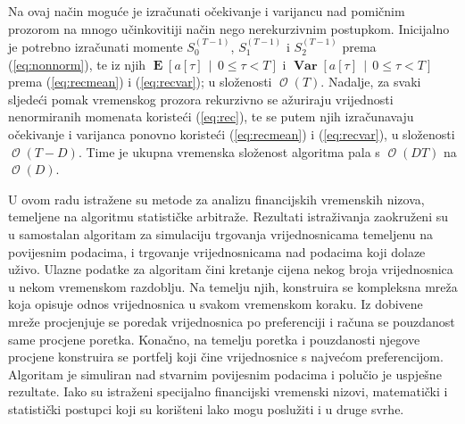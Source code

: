 \documentclass[lmodern, utf8, diplomski, numeric]{fer}
\newcommand{\Efromto}[2]{\operatorname{\mathbf{E}}\q[#1\, \middle\vert\, #2\w]}
\newcommand{\Varfromto}[2]{\operatorname{\mathbf{Var}}\q[#1\, \middle\vert\, #2\w]}
\newcommand{\bigO}[1]{\operatorname{\mathcal{O}}\q(#1\w)}
\newcommand{\q}{\left}
\newcommand{\w}{\right}
\begin{document}
  Na ovaj način moguće je izračunati očekivanje i varijancu nad pomičnim prozorom na mnogo učinkovitiji način nego nerekurzivnim postupkom.
  Inicijalno je potrebno izračunati momente $S_0^{(T - 1)}$, $S_1^{(T - 1)} $ i $S_2^{(T - 1)}$ prema (\ref{eq:nonnorm}), te iz njih $\Efromto{a\q[\tau\w]}{0 \le \tau < T}$ i $\Varfromto{a\q[\tau\w]}{0 \le \tau < T}$ prema (\ref{eq:recmean}) i (\ref{eq:recvar}); u složenosti $\bigO{T}$.
  Nadalje, za svaki sljedeći pomak vremenskog prozora rekurzivno se ažuriraju vrijednosti nenormiranih momenata koristeći (\ref{eq:rec}), te se putem njih izračunavaju očekivanje i varijanca ponovno koristeći (\ref{eq:recmean}) i (\ref{eq:recvar}), u složenosti $\bigO{T - D}$.
  Time je ukupna vremenska složenost algoritma pala s $\bigO{DT}$ na $\bigO{D}$.

  \begin{sazetak}
  U ovom radu istražene su metode za analizu financijskih vremenskih nizova, temeljene na algoritmu statističke arbitraže.
  Rezultati istraživanja zaokruženi su u samostalan algoritam za simulaciju trgovanja vrijednosnicama temeljenu na povijesnim podacima, i trgovanje vrijednosnicama nad podacima koji dolaze uživo.
  Ulazne podatke za algoritam čini kretanje cijena nekog broja vrijednosnica u nekom vremenskom razdoblju.
  Na temelju njih, konstruira se kompleksna mreža koja opisuje odnos vrijednosnica u svakom vremenskom koraku.
  Iz dobivene mreže procjenjuje se poredak vrijednosnica po preferenciji i računa se pouzdanost same procjene poretka.
  Konačno, na temelju poretka i pouzdanosti njegove procjene konstruira se portfelj koji čine vrijednosnice s najvećom preferencijom.
  Algoritam je simuliran nad stvarnim povijesnim podacima i polučio je uspješne rezultate.
  Iako su istraženi specijalno financijski vremenski nizovi, matematički i statistički postupci koji su korišteni lako mogu poslužiti i u druge svrhe.

  \end{sazetak}
  \pagebreak
\end{document}
